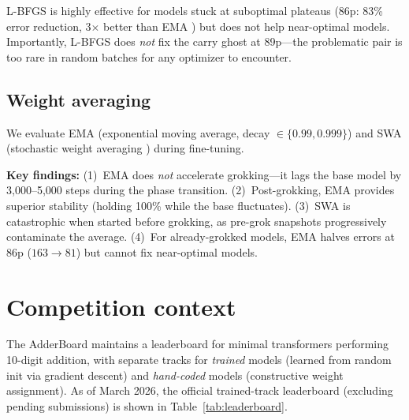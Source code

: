 \documentclass[11pt]{article}
\begin{document}
L-BFGS is highly effective for models stuck at suboptimal plateaus (86p:
83\% error reduction, 3$\times$ better than EMA
\citep{izmailov2018averaging}) but does not help near-optimal models.
Importantly, L-BFGS does \emph{not} fix the carry ghost at 89p---the
problematic pair is too rare in random batches for any optimizer to
encounter.

\subsection{Weight averaging}

We evaluate EMA (exponential moving average, decay $\in \{0.99, 0.999\}$)
and SWA (stochastic weight averaging \citep{izmailov2018averaging}) during
fine-tuning.

\textbf{Key findings:} (1)~EMA does \emph{not} accelerate grokking---it
lags the base model by 3,000--5,000 steps during the phase transition.
(2)~Post-grokking, EMA provides superior stability (holding 100\% while
the base fluctuates). (3)~SWA is catastrophic when started before
grokking, as pre-grok snapshots progressively contaminate the average.
(4)~For already-grokked models, EMA halves errors at 86p ($163 \to 81$)
but cannot fix near-optimal models.

\section{Competition context}
\label{sec:competition}

The AdderBoard \citep{adderboard2025} maintains a leaderboard for
minimal transformers performing 10-digit addition, with separate tracks
for \emph{trained} models (learned from random init via gradient descent)
and \emph{hand-coded} models (constructive weight assignment). As of
March 2026, the official trained-track leaderboard (excluding pending
submissions) is shown in Table~\ref{tab:leaderboard}.
\end{document}
